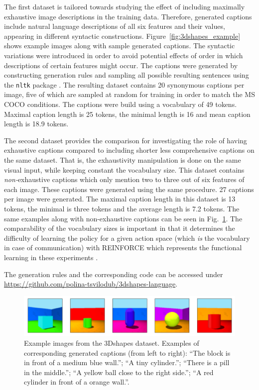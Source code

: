 The first dataset is tailored towards studying the effect of including maximally exhaustive image descriptions in the training data. Therefore, generated captions include natural language descriptions of all six features and their values, appearing in different syntactic constructions. Figure~\ref{fig:3dshapes_example} shows example images along with sample generated captions. The syntactic variations were introduced in order to avoid potential effects of order in which descriptions of certain features might occur.
The captions were generated by constructing generation rules and sampling all possible resulting sentences using the \texttt{nltk} package \parencite{bird2006nltk}. The resulting dataset contains 20 synonymous captions per image, five of which are sampled at random for training in order to match the MS COCO conditions. The captions were build using a vocabulary of 49 tokens. Maximal caption length is 25 tokens, the minimal length is 16 and mean caption length is 18.9 tokens. 

The second dataset provides the comparison for investigating the role of having exhaustive captions compared to including shorter less comprehensive captions on the same dataset. That is, the exhaustivity manipulation is done on the same visual input, while keeping constant the vocabulary size. This dataset contains \textit{non-}exhaustive captions which only mention two to three out of six features of each image. These captions were generated using the same procedure. 27 captions per image were generated. The maximal caption length in this dataset is 13 tokens, the minimal is three tokens and the average length is 7.2 tokens.
The same examples along with non-exhaustive captions can be seen in Fig.~\ref{fig:3dshapes_example_short}.
The comparability of the vocabulary sizes is important in that it determines the difficulty of learning the policy for a given action space (which \emph{is} the vocabulary in case of communication) with REINFORCE which represents the functional learning in these experiments \parencite[cf.][]{havrylov2017emergence}.

The generation rules and the corresponding code can be accessed under \url{https://github.com/polina-tsvilodub/3dshapes-language}.

\begin{figure}
	\centering
	\includegraphics[width=\linewidth]{images/3dshapes_example.png}
	\caption{Example images from the 3Dshapes dataset. Examples of corresponding generated captions (from left to right): ``The block is in front of a medium blue wall.''; ``A tiny cylinder.''; ``There is a pill in the middle.''; ``A yellow ball close to the right side.''; ``A red cylinder in front of a orange wall.''.}
	\label{fig:3dshapes_example_short}
\end{figure} 

